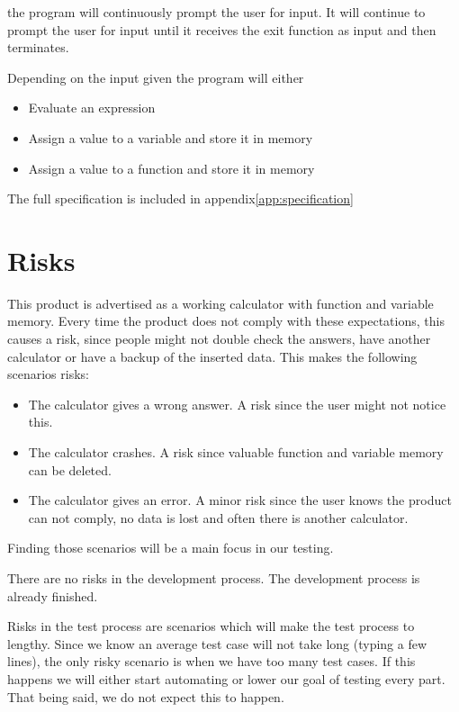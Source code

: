 \documentclass[11pt,a4paper]{article}
\begin{document}

the program will continuously prompt the user for input. It will
continue to prompt the user for input until it receives the exit
function as input and then terminates.

Depending on the input given the program will either

\begin{itemize}
\item Evaluate an expression
\item Assign a value to a variable and store it in memory
\item Assign a value to a function and store it in memory
\end{itemize}
The full specification is included in appendix\ref{app:specification}

\section{Risks}
This product is advertised as a working calculator with function and variable memory. Every time the product does not comply with these expectations, this causes a risk, since people might not double check the answers, have another calculator or have a backup of the inserted data. This makes the following scenarios risks:
\begin{itemize}
	\item The calculator gives a wrong answer. A risk since the user might not notice this.
	\item The calculator crashes. A risk since valuable function and variable memory can be deleted.
	\item The calculator gives an error. A minor risk since the user knows the product can not comply, no data is lost and often there is another calculator.
\end{itemize}
Finding those scenarios will be a main focus in our testing.

There are no risks in the development process. The development process is already finished.

Risks in the test process are scenarios which will make the test process to lengthy. Since we know an average test case will not take long (typing a few lines), the only risky scenario is when we have too many test cases. If this happens we will either start automating or lower our goal of testing every part. That being said, we do not expect this to happen.
\end{document}
